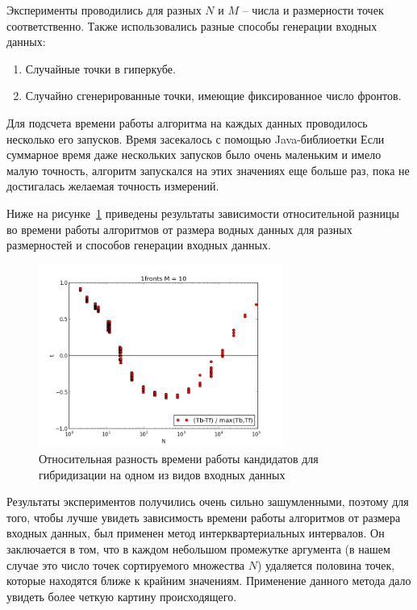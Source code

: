 Эксперименты проводились для разных $N$ и $M$ -- числа и размерности точек соответственно. Также использовались
разные способы генерации входных данных:

\begin{enumerate}
 \item Случайные точки в гиперкубе.
 \item Случайно сгенерированные точки, имеющие фиксированное число фронтов.
\end{enumerate}

Для подсчета времени работы алгоритма на каждых данных проводилось несколько его запусков. Время засекалось с помощью
Java-библиоетки %
Если суммарное время даже нескольких запусков было очень маленьким и имело малую точность, алгоритм запускался на
этих значениях еще больше раз, пока не достигалась желаемая точность измерений.

Ниже на рисунке~\ref{experiment} приведены результаты зависимости относительной разницы во времени работы алгоритмов
от размера водных данных для разных размерностей и способов генерации входных данных.


\begin{figure}
\begin{center}
\includegraphics[width=8cm]{pic/bos_fast.png}
\caption{Относительная разность времени работы кандидатов для гибридизации на одном из видов входных данных}
\label{experiment}
\end{center} %
\end{figure}

Результаты экспериментов получились очень сильно зашумленными, поэтому для того, чтобы лучше увидеть зависимость
времени работы алгоритмов от размера входных данных, был применен метод интерквартериальных интервалов. Он
заключается в том, что в каждом небольшом промежутке аргумента (в нашем случае это число точек сортируемого
множества $N$) удаляется половина точек, которые находятся ближе к крайним значениям. Применение данного метода
дало увидеть более четкую картину происходящего.

